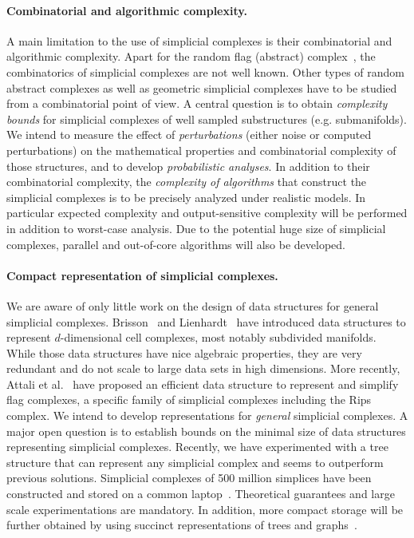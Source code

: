 \paragraph{Combinatorial and algorithmic complexity.}
A main limitation to the use of simplicial complexes is their combinatorial and algorithmic complexity.  Apart for the random flag (abstract) complex~\cite{CambridgeJournals:2077252}, the combinatorics of simplicial complexes are not well known. Other types of random abstract complexes as well as geometric simplicial complexes have to be studied from a combinatorial point of view. A central question is to obtain {\em complexity bounds} for simplicial complexes of well sampled substructures (e.g. submanifolds).  We intend to measure the effect of {\em perturbations} (either noise or computed perturbations) on the mathematical properties and combinatorial complexity of those structures, and to develop {\em probabilistic analyses}. 
In addition to their combinatorial complexity, the {\em complexity of algorithms} that construct the simplicial complexes is to be precisely analyzed under realistic models. In particular expected complexity and output-sensitive complexity will be performed in addition to worst-case analysis. Due to the potential huge size of simplicial complexes, parallel and out-of-core algorithms will also be developed. %


\paragraph{Compact representation of simplicial complexes.} We are aware of only little work on the design of data structures for general simplicial complexes. Brisson~\cite{Brisson:1989:RGS:73833.73858} and Lienhardt~\cite{DBLP:journals/ijcga/Lienhardt94} have introduced data structures to represent $d$-dimensional cell complexes, most notably subdivided manifolds. While those data structures have nice algebraic properties, they are very redundant and do not scale to large data sets in high dimensions. More recently, Attali et al.~\cite{Attali2011} have proposed an efficient data structure to represent and simplify flag complexes, a specific family of simplicial complexes including the Rips complex.  We intend to develop representations for {\em general} simplicial complexes. 
A major open question is to establish bounds on the minimal size of data structures representing simplicial complexes.
 Recently, we have experimented with a tree structure that can represent any simplicial complex and seems to outperform previous solutions. Simplicial complexes of 500 million simplices have been constructed and stored on a common laptop~\cite{bm-dssc-2012}.  Theoretical guarantees and large scale experimentations are mandatory. In addition, more compact storage will be further obtained by using succinct representations of trees and graphs~\cite{Ferragina:2005:SLT:1097112.1097456,Munro:2002:SRB:586840.586885}. 










